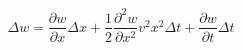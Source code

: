 \documentclass[letterpaper]{article}
\begin{document}
$$\Delta w = \frac{\partial w}{\partial x} \Delta x + \frac{1}{2} \frac{\partial^2 w}{\partial x^2} v^2 x^2 \Delta t + \frac{\partial w}{\partial t} \Delta t$$
\end{document}
